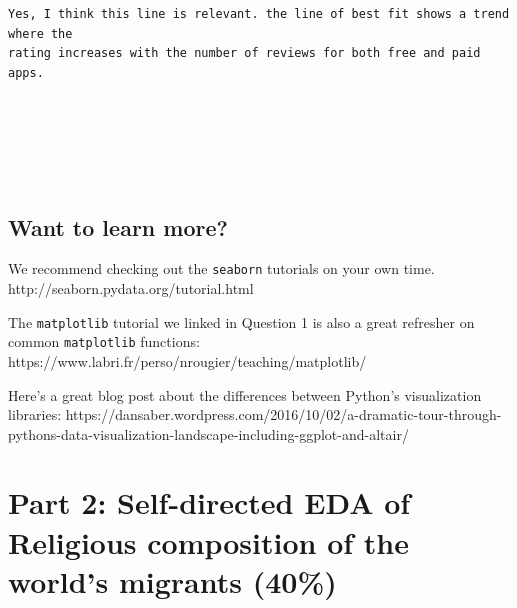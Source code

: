 \documentclass[11pt]{article}
\begin{document}
    \begin{Verbatim}[commandchars=\\\{\}]
Yes, I think this line is relevant. the line of best fit shows a trend where the
rating increases with the number of reviews for both free and paid apps.
    \end{Verbatim}

    \begin{center}
    \end{center}
    { \hspace*{\fill} \\}
    
    \begin{center}
    \end{center}
    { \hspace*{\fill} \\}
    
    \begin{center}
    \end{center}
    { \hspace*{\fill} \\}
    
    \subsection{Want to learn more?}\label{want-to-learn-more}

We recommend checking out the \texttt{seaborn} tutorials on your own
time. http://seaborn.pydata.org/tutorial.html

The \texttt{matplotlib} tutorial we linked in Question 1 is also a great
refresher on common \texttt{matplotlib} functions:
https://www.labri.fr/perso/nrougier/teaching/matplotlib/

Here's a great blog post about the differences between Python's
visualization libraries:
https://dansaber.wordpress.com/2016/10/02/a-dramatic-tour-through-pythons-data-visualization-landscape-including-ggplot-and-altair/

\section{Part 2: Self-directed EDA of Religious composition of the
world's migrants
(40\%)}\label{part-2-self-directed-eda-of-religious-composition-of-the-worlds-migrants-40}
\end{document}
